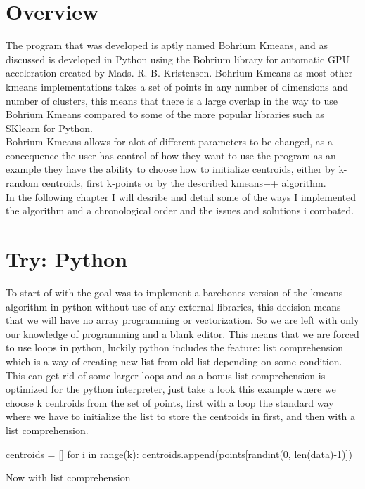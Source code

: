 \documentclass[12pt]{report}
\begin{document}
\section{Overview}
\label{subsec:overview}
The program that was developed is aptly named Bohrium Kmeans, and as discussed is developed in Python using the Bohrium library for automatic GPU acceleration created by Mads. R. B. Kristensen. Bohrium Kmeans as most other kmeans implementations takes a set of points in any number of dimensions and number of clusters, this means that there is a large overlap in the way to use Bohrium Kmeans compared to some of the more popular libraries such as SKlearn for Python.\\
Bohrium Kmeans allows for alot of different parameters to be changed, as a concequence the user has control of how they want to use the program as an example they have the ability to choose how to initialize centroids, either by k-random centroids, first k-points or by the described kmeans++ algorithm.\\
In the following chapter I will desribe and detail some of the ways I implemented the algorithm and a chronological order and the issues and solutions i combated.
\section{Try: Python}
\label{subsec:beginning}
To start of with the goal was to implement a barebones version of the kmeans algorithm in python without use of any external libraries, this decision means that we will have no array programming or vectorization. So we are left with only our knowledge of programming and a blank editor.
This means that we are forced to use loops in python, luckily python includes the feature: list comprehension which is a way of creating new list from  old list depending on some condition. This can get rid of some larger loops and as a bonus list comprehension is optimized for the python interpreter, just take a look this example where we choose k centroids from the set of points, first with a loop the standard way where we have to initialize the list to store the centroids in first, and then with a list comprehension.

\begin{python}[caption={Generating k random centroids using for loop in python}]
  centroids = []
  for i in range(k):
      centroids.append(points[randint(0, len(data)-1)])
\end{python}
Now with list comprehension
\end{document}
